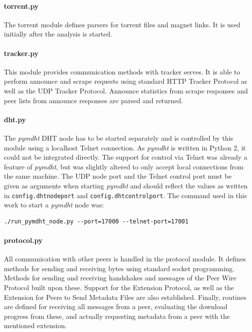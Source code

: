 \documentclass[10pt, a4paper, twoside=false, headsepline]{scrbook}
\renewcommand{\_}{\origunderscore\allowbreak}
\newcommand{\config}[1]{\texttt{config.\allowbreak #1}}
\begin{document}
\paragraph{torrent.py} The torrent module defines parsers for torrent files and magnet links. It is used initially after the analysis is started.

\paragraph{tracker.py} This module provides communication methods with tracker serves. It is able to perform announce and scrape requests using standard HTTP Tracker Protocol as well as the UDP Tracker Protocol. Announce statistics from scrape responses and peer lists from announce responses are parsed and returned.

\paragraph{dht.py} The \emph{pymdht} DHT node has to be started separately and is controlled by this module using a localhost Telnet connection. As \emph{pymdht} is written in Python 2, it could not be integrated directly. The support for control via Telnet was already a feature of \emph{pymdht}, but was slightly altered to only accept local connections from the same machine. The UDP node port and the Telnet control port must be given as arguments when starting \emph{pymdht} and should reflect the values as written in \config{dht\_node\_port} and \config{dht\_control\_port}. The command used in this work to start a \emph{pymdht} node was:
\begin{lstlisting}
./run_pymdht_node.py --port=17000 --telnet-port=17001
\end{lstlisting}

\paragraph{protocol.py} All communication with other peers is handled in the protocol module. It defines methods for sending and receiving bytes using standard socket programming. Methods for sending and receiving handshakes and messages of the Peer Wire Protocol built upon these. Support for the Extension Protocol, as well as the Extension for Peers to Send Metadata Files are also established. Finally, routines are defined for receiving all messages from a peer, evaluating the download progress from these, and actually requesting metadata from a peer with the mentioned extension.
\end{document}
